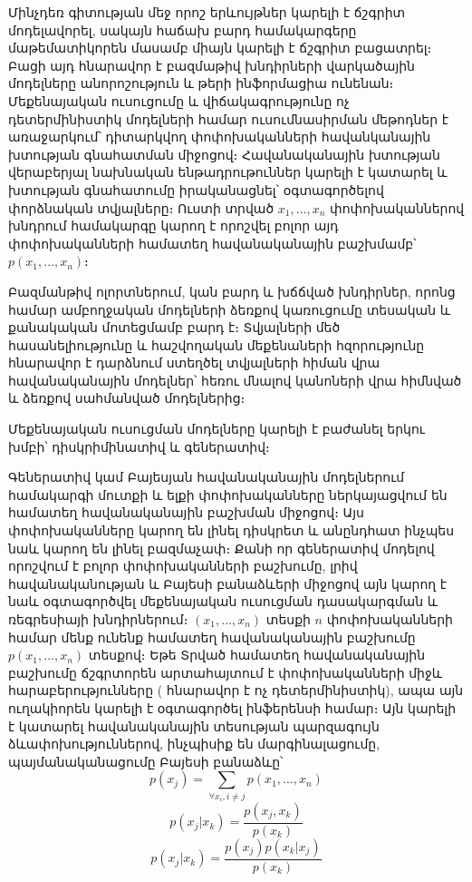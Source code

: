 \documentclass[11pt]{article}
\begin{document}
\par Մինչդեռ գիտության մեջ որոշ երևույթներ կարելի է ճշգրիտ մոդելավորել, սակայն հաճախ բարդ համակարգերը մաթեմատիկորեն մասամբ միայն կարելի է ճշգրիտ բացատրել։ Բացի այդ հնարավոր է բազմաթիվ խնդիրների վարկածային մոդելները անորոշություն և թերի ինֆորմացիա ունենան։ Մեքենայական ուսուցումը և վիճակագրությունը ոչ դետերմինիստիկ մոդելների համար ուսումնասիրման մեթոդներ է առաջարկում՝  դիտարկվող փոփոխականների հավանկանային խտության գնահատման միջոցով։ Հավանականային խտության վերաբերյալ նախնական ենթադրութուններ կարելի է կատարել և խտության գնահատումը իրականացնել՝ օգտագործելով փորձնական տվյալները։ Ուստի տրված $x_1, ..., x_n$ փոփոխականներով խնդրում համակարգը կարող է որոշվել բոլոր այդ փոփոխականների համատեղ հավանականային բաշխմամբ՝ $p  \left ( x_1, ..., x_n \right )$։
\par Բազմանթիվ ոլորտներում, կան բարդ և խճճված խնդիրներ, որոնց համար ամբողջական մոդելների ձեռքով կառուցումը  տեսական և քանակական մոտեցմամբ  բարդ է։ Տվյալների մեծ հասանելիությունը և հաշվողական մեքենաների հզորությունը հնարավոր է դարձնում ստեղծել տվյալների հիման վրա հավանականային մոդելներ՝ հեռու մնալով կանոների վրա հիմնված և ձեռքով սահմանված մոդելներից։ 

\par
Մեքենայական ուսուցման մոդելները կարելի է բաժանել երկու խմբի՝ դիսկրիմինատիվ և գեներատիվ։


Գեներատիվ կամ Բայեսյան հավանականային մոդելներում համակարգի մուտքի և ելքի փոփոխականները ներկայացվում են համատեղ հավանականային բաշխման միջոցով։ Այս փոփոխականները կարող են լինել դիսկրետ և անընդհատ ինչպես նաև կարող են լինել բազմաչափ։ Քանի որ գեներատիվ մոդելով որոշվում է բոլոր փոփոխականների բաշխումը, լրիվ  հավանականության և Բայեսի բանաձևերի միջոցով   այն կարող է նաև օգտագործվել մեքենայական ուսուցման դասակարգման և ռեգրեսիայի խնդիրներում։ $(x_1, ..., x_n)$ տեսքի $n$ փոփոխականների համար մենք ունենք համատեղ հավանականային բաշխումը $p(x_1, ..., x_n)$ տեսքով։ Եթե Տրված համատեղ հավանականային բաշխումը ճշգրտորեն արտահայտում է փոփոխականների միջև հարաբերությունները ( հնարավոր է ոչ դետերմինիստիկ), ապա այն ուղակիորեն կարելի է օգտագործել ինֆերենսի համար։  Այն կարելի է կատարել հավանականային տեսության պարզագույն ձևափոխություններով, ինչպիսիք են մարգինալացումը, պայմանականացումը Բայեսի բանաձևը՝
$$p(x_j) = \sum_{\forall x_i, i \neq j}{p(x_1, ..., x_n)}$$
$$p(x_j | x_k) = \frac {p(x_j, x_k)} {p(x_k)}$$
$$p(x_j | x_k) = \frac {p(x_j)p(x_k |x_j)} {p(x_k)}$$
\end{document}

